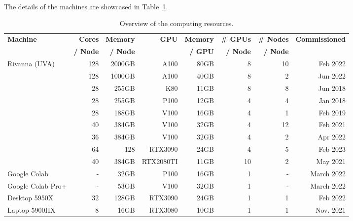 \documentclass[utf8]{FrontiersinVancouver} %
\begin{document}
The details of the machines are showcased in Table~\ref{tab:hwoverview}.

\begin{table}[htb]
    \caption{Overview of the computing resources.}
    \label{tab:hwoverview}
    \begin{center}
    {\footnotesize
    \begin{tabular}{|l|r|r|r|r|r|r|r|}
        \hline
            {\bf Machine}  & {\bf Cores} & {\bf Memory} & {\bf GPU}   &   {\bf Memory} & {\bf \# GPUs} & {\bf \# Nodes}  & {\bf Commissioned} \\ 
                     &  {\bf / Node} & {\bf / Node}  &  & {\bf / GPU} & {\bf / Node}     &   {\bf / Node}        &  \\
        \hline
        \hline
        Rivanna (UVA)    & 128 & 2000GB   & A100 & 80GB &  8  & 10 & Feb 2022 \\
                        & 128 & 1000GB   & A100 & 40GB &  8  &  2 & Jun 2022  \\   
                        & 28  & 255GB    & K80  & 11GB &  8  &  8 & Jun 2018         \\
                        & 28  & 255GB    & P100 & 12GB &  4  &  4 & Jan 2018         \\
                        & 28  & 188GB    & V100 & 16GB &  4  &  1 & Feb 2019          \\
                        & 40  & 384GB    & V100 & 32GB &  4  & 12 & Feb 2021          \\
                        & 36  & 384GB    & V100 & 32GB &  4  &  2 & Apr 2022          \\
                        &  64 & 128     & RTX3090   & 24GB    & 4   &  5 & Feb 2023         \\
                        & 40  & 384GB    & RTX2080TI & 11GB & 10  &  2 & May 2021 \\                        
         \hline
         Google Colab      & -   & 32GB      & P100      & 16GB    & 1 & - & March 2022 \\
         Google Colab Pro+ & -   & 53GB      & V100      & 32GB    & 1 & - & March 2022 \\
         \hline
         Desktop 5950X     &  32 & 128GB     & RTX3090   & 24GB    & 1 & 1 & Feb 2022   \\
         \hline
         Laptop 5900HX     &   8 & 16GB      & RTX3080   & 10GB    & 1 & 1 & Nov. 2021 \\
         \hline
    \end{tabular}
    }
    \end{center}


\end{table}
\end{document}
